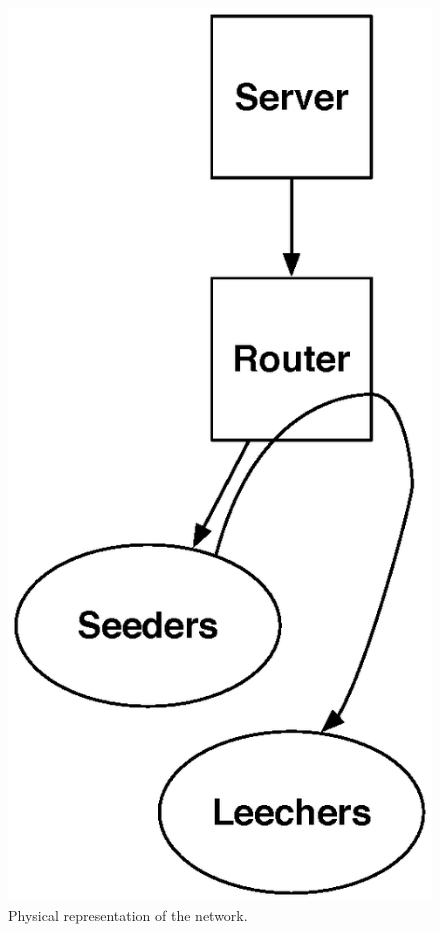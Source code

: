 \documentclass[conference]{IEEEtran}
\begin{document}
\begin{figure}[htp!]
\begin{center}
\includegraphics[scale=0.35]{graphs/topology.eps}
\end{center}
\caption{Physical representation of the network.}
\label{fig:dummy}
\vspace{-2mm}
\end{figure} 
\end{document}
